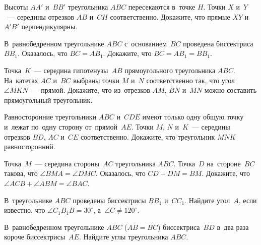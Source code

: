 


\begin{problems}

\item
Высоты $AA'$ и~$BB'$ треугольника $ABC$ пересекаются в~точке $H$.
Точки $X$ и~$Y$~--- середины отрезков $AB$ и~$CH$ соответственно.
Докажите, что прямые $XY$ и~$A'B'$ перпендикулярны.

\item
В~равнобедренном треугольнике $ABC$ с~основанием~$BC$ проведена
биссектриса~$B B_1$.
Оказалось, что $B C = A B_1$.
Докажите, что $B C = A B_1 = B B_1$.

\item
Точка~$K$~--- середина гипотенузы~$AB$ прямоугольного треугольника $ABC$.
На~катетах $AC$ и~$BC$ выбраны точки $M$ и~$N$ соответственно так, что угол
$\angle MKN$~--- прямой.
Докажите, что из~отрезков $AM$, $BN$ и~$MN$ можно составить прямоугольный
треугольник.

\item
Равносторонние треугольники $ABC$ и~$CDE$ имеют только одну общую точку и~лежат
по~одну сторону от~прямой~$AE$.
Точки $M$, $N$ и~$K$~--- середины отрезков $BD$, $AC$ и~$CE$ соответственно.
Докажите, что треугольник $MNK$ равносторонний.

\item
Точка~$M$~--- середина стороны~$AC$ треугольника $ABC$.
Точка~$D$ на~стороне~$BC$ такова, что $\angle BMA = \angle DMC$.
Оказалось, что $CD + DM = BM$.
Докажите, что $\angle ACB + \angle ABM = \angle BAC$.

\item
В~треугольнике $ABC$ проведены биссектрисы $B B_1$ и~$C C_1$.
Найдите угол~$A$, если известно, что $\angle C_1 B_1 B = 30^{\circ}$,
а~$\angle C \neq 120^{\circ}$.

\item
В~равнобедренном треугольнике $ABC$ ($AB = BC$) биссектриса~$BD$ в~два раза
короче биссектрисы~$AE$.
Найдите углы треугольника $ABC$.

\end{problems}

